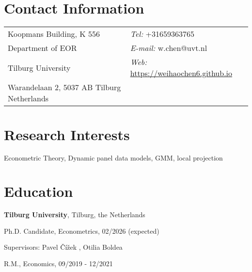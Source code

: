 \documentclass[margin,line]{res}
\newenvironment{list1}{
  \begin{list}{\ding{113}}{%
      \setlength{\itemsep}{0in}
      \setlength{\parsep}{0in} \setlength{\parskip}{0in}
      \setlength{\topsep}{0in} \setlength{\partopsep}{0in} 
      \setlength{\leftmargin}{0.17in}}}{\end{list}}
\begin{document}

\begin{resume}
\section{\sc Contact Information}
\vspace{.05in}
\begin{tabular}{@{}p{2in}p{4in}}
Koopmans Building, K 556     & {\it Tel:}  +31659363765 \\            
Department of EOR   &  {\it E-mail:}  w.chen@uvt.nl\\         
Tilburg University &{\it Web:} \url{https://weihaochen6.github.io} \\       
Warandelaan 2, 5037 AB Tilburg Netherlands  & \\     
\end{tabular}

\section{\sc Research Interests}
Econometric Theory, Dynamic panel data models, GMM, local projection
\section{\sc Education}
{\bf Tilburg University}, Tilburg, the Netherlands\\
\vspace*{-.1in}
\begin{list1}
\item[] Ph.D. Candidate, Econometrics, 02/2026 (expected) 
\vspace*{.05in}
\item[] Supervisors:  Pavel \v{C}\'{i}\v{z}ek
, Otilia Boldea
%
%
\vspace*{.05in}
\item[] R.M., Economics,  09/2019 - 12/2021
\end{list1}


\end{resume}
\end{document}
